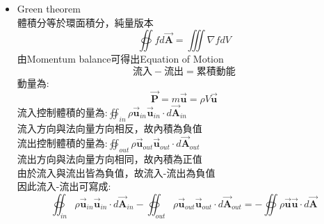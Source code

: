 \documentclass[../main.tex]{subfiles}
\begin{document}
\begin{itemize}
\begin{equation}
      -\oiint \vec {\bm u} \cdot d\vec {\bm A} = \frac{\partial }{\partial t} \iiint_{V} \rho dV \label{eq:mass_balance_by_gauss}
    \end{equation}
    利用Gauss theorem，可將左邊面積分轉為體積分:
    \begin{equation}
      -\iiint \nabla \cdot \vec {\bm u} dV = \frac{\partial }{\partial t} \iiint_{V} \rho dV
    \end{equation}
    將右邊微分移到體積積分內:
    \begin{equation}
      \iiint_{V} \left(-\nabla \cdot \vec {\bm u} - \frac{\partial \rho}{\partial t}\right) dV = 0
    \end{equation}
    由於體積積分為0，故積分內的函數必為0:
    \begin{equation}
      -\nabla \cdot \vec {\bm u} - \frac{\partial \rho}{\partial t} = 0
    \end{equation}
    故可得出Equation of Continuity
  \item Green theorem\\
    體積分等於環面積分，純量版本
    \begin{equation}
      \oiint f d\vec {\bm A} = \iiint \nabla f dV
    \end{equation}
    由Momentum balance可得出Equation of Motion
    \begin{equation}
      \text{流入} - \text{流出} =\text{累積動能}
    \end{equation}
    動量為:
    \begin{equation}
      \vec {\bm P} = m \vec {\bm u} = \rho V \vec {\bm u}
    \end{equation}
    流入控制體積的量為:$\oiint_{in} \rho \vec {\bm u}_{in} \vec {\bm u}_{in} \cdot d\vec {\bm A}_{in}$\\
    流入方向與法向量方向相反，故內積為負值\\
    流出控制體積的量為:$\oiint_{out} \rho \vec {\bm u}_{out} \vec {\bm u}_{out} \cdot d\vec {\bm A}_{out}$\\
    流出方向與法向量方向相同，故內積為正值\\
    由於流入與流出皆為負值，故流入-流出為負值\\
    因此流入-流出可寫成:
    \begin{equation}
      \oiint_{in} \rho \vec {\bm u}_{in} \vec {\bm u}_{in} \cdot d\vec {\bm A}_{in} - \oiint_{out} \rho \vec {\bm u}_{out} \vec {\bm u}_{out} \cdot d\vec {\bm A}_{out} 
      = -\oiint \rho \vec {\bm u} \vec {\bm u} \cdot d\vec {\bm A}
    \end{equation}

\end{itemize}
\end{document}
